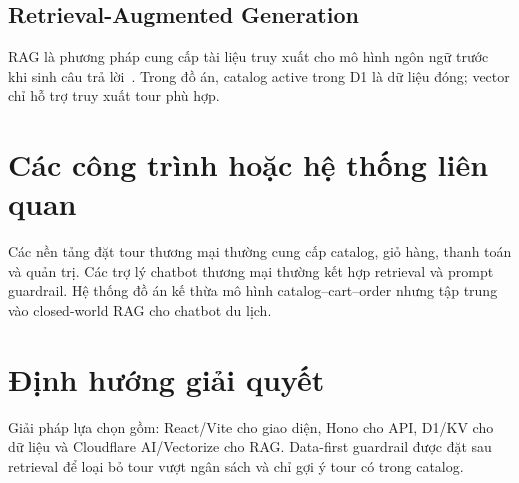 \subsection{Retrieval-Augmented Generation}
RAG là phương pháp cung cấp tài liệu truy xuất cho mô hình ngôn ngữ trước khi sinh câu trả lời~\cite{Lewis2020RAG}. Trong đồ án, catalog active trong D1 là dữ liệu đóng; vector chỉ hỗ trợ truy xuất tour phù hợp.

\section{Các công trình hoặc hệ thống liên quan}
Các nền tảng đặt tour thương mại thường cung cấp catalog, giỏ hàng, thanh toán và quản trị. Các trợ lý chatbot thương mại thường kết hợp retrieval và prompt guardrail. Hệ thống đồ án kế thừa mô hình catalog--cart--order nhưng tập trung vào closed-world RAG cho chatbot du lịch.

\section{Định hướng giải quyết}
Giải pháp lựa chọn gồm: React/Vite cho giao diện, Hono cho API, D1/KV cho dữ liệu và Cloudflare AI/Vectorize cho RAG. Data-first guardrail được đặt sau retrieval để loại bỏ tour vượt ngân sách và chỉ gợi ý tour có trong catalog.
